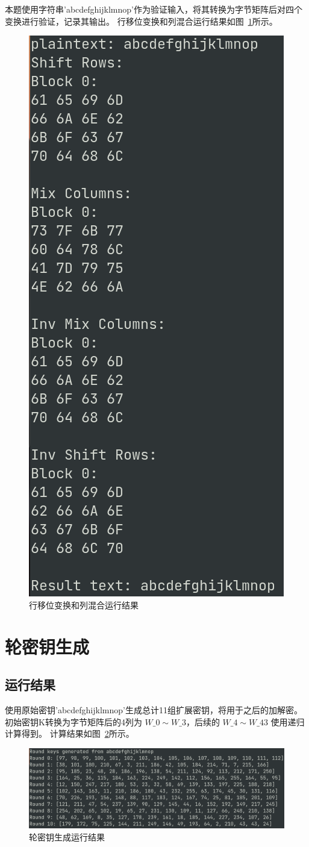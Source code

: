 \documentclass[degree=project,degree-type=project,cjk-font=noto]{thuthesis}
\begin{document}
本题使用字符串'abcdefghijklmnop'作为验证输入，将其转换为字节矩阵后对四个变换进行验证，记录其输出。
行移位变换和列混合运行结果如图~\ref{fig:t2}所示。

\begin{figure}[h]
\centering%
\includegraphics[width=.4\linewidth]{aes_t2.png}
  \caption{行移位变换和列混合运行结果}
  \label{fig:t2}
\end{figure}

\section{轮密钥生成}

\subsection{运行结果}

使用原始密钥'abcdefghijklmnop'生成总计11组扩展密钥，将用于之后的加解密。初始密钥K转换为字节矩阵后的4列为 $W\_0 \sim W\_3$，后续的 $W\_4 \sim W\_{43}$ 使用递归计算得到。
计算结果如图~\ref{fig:t3}所示。

    \begin{figure}[h]
\centering%
\includegraphics[width=\linewidth]{aes_t3.png}
  \caption{轮密钥生成运行结果}
  \label{fig:t3}
\end{figure}
\end{document}
